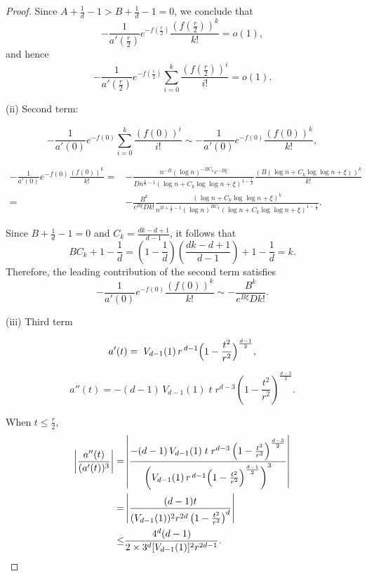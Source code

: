 \documentclass[10pt,a4paper]{amsart}
\begin{document}
\begin{proof}
	Since  $A+\frac{1}{d}-1 > B + \frac{1}{d}-1 = 0$, we conclude that
	$$
	 -\frac{1}{a'(\frac{r}{2})}e^{-f(\frac{r}{2})}\frac{(f(\frac{r}{2}))^k}{k!} = o(1),
	$$
	and hence
	$$
		-\frac{1}{a'(\frac{r}{2})}e^{-f(\frac{r}{2})}\sum_{i=0}^{k}\frac{(f(\frac{r}{2}))^i}{i!} = o(1).
	$$
	
	(ii) Second term:
	
	$$
	-\frac{1}{a'(0)}e^{-f(0)}\sum_{i=0}^{k}\frac{(f(0))^i}{i!} \sim -\frac{1}{a'(0)}e^{-f(0)}\frac{(f(0))^k}{k!},
	$$
	
	\begin{equation*}
		\begin{aligned}
			-\frac{1}{a'(0)}e^{-f(0)}\frac{(f(0))^k}{k!} =& -\frac{n^{-B} (\log n)^{-BC_k}e^{-B\xi}}{Dn^{\frac{1}{d}-1}\left(\log n+ C_k \log\log n+\xi\right)^{1-\frac{1}{d}}} \frac{(B\left( \log n+ C_k \log\log n+\xi\right))^k}{k!} \\
			= & -\frac{B^k}{e^{B\xi}Dk!} \frac{\left( \log n+ C_k \log\log n+\xi\right)^k}{n^{B+\frac{1}{d}-1}(\log n)^{BC_k}\left(\log n+ C_k \log\log n+\xi\right)^{1-\frac{1}{d}}}.
		\end{aligned}
	\end{equation*}
	
	Since $B + \frac{1}{d} - 1 = 0$ and $C_k=\frac{dk-d+1}{d-1}$, it follows that
	$$
		BC_k + 1 - \frac{1}{d} = \left(1-\frac{1}{d}\right)\left(\frac{dk-d+1}{d-1}\right)+1-\frac{1}{d} = k.
	$$
	Therefore, the leading contribution of the second term satisfies
	$$
		-\frac{1}{a'(0)}e^{-f(0)}\frac{(f(0))^k}{k!} \sim -\frac{B^k}{e^{B\xi}Dk!}.
	$$
	

	(iii) Third term

	
	$$
	a'(t)
	=\;V_{d-1}(1)\,r^{\,d-1}\Bigl(1-\frac{t^2}{r^2}\Bigr)^{\frac{d-1}2},
	$$
	
	$$
	a''(t)
	= - (d-1)\,V_{d-1}(1)\; t\; r^{d-3}\left(1 - \frac{t^2}{r^2}\right)^{\frac{d-3}{2}}.
	$$
	
	When $t\leq \frac{r}{2}$,
	\begin{equation*}
		\begin{aligned}
			\left|\frac{a''(t)}{(a'(t))^3}\right|=&\left|\frac{- (d-1)\,V_{d-1}(1)\; t\; r^{d-3}\left(1 - \frac{t^2}{r^2}\right)^{\frac{d-3}{2}}}{\left(V_{d-1}(1)\,r^{\,d-1}\Bigl(1-\frac{t^2}{r^2}\Bigr)^{\frac{d-1}2}\right)^3}\right| \\
			=& \left|\frac{(d-1)t}{(V_{d-1}(1))^2r^{2d}\left(1 - \frac{t^2}{r^2}\right)^{d}}\right| \\
			\leq& \frac{4^d(d-1)}{2\times 3^d[V_{d-1}(1)]^2r^{2d-1}}.
		\end{aligned}
	\end{equation*}
	

\end{proof}
\end{document}
